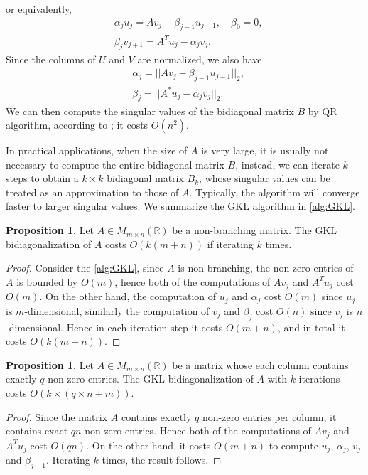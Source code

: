 \documentclass{article}
\theoremstyle{definition}
\newtheorem{proposition}[theorem]{Proposition}
\begin{document}
or equivalently,
\[
\begin{aligned}
&\alpha_ju_j=Av_j-\beta_{j-1}u_{j-1},
\quad \beta_0=0,\\
&\beta_{j}v_{j+1}=A^Tu_j-\alpha_jv_j.
\end{aligned}
\]
Since the columns of $U$ and $V$ are normalized,
we also have
\[
\begin{aligned}
&\alpha_j=||Av_j-\beta_{j-1}u_{j-1}||_2,\\
&\beta_j=||A^*u_j-\alpha_jv_j||_2.
\end{aligned}
\]
We can then compute the singular values of the bidiagonal matrix $B$ by QR algorithm,
according to \cite[Section 6.2]{MR1792141}; 
it costs $O(n^2)$.

In practical applications,
when the size of $A$ is very large,
it is usually not necessary to compute the entire bidiagonal matrix $B$,
instead,
we can iterate $k$ steps to obtain a $k\times k$ bidiagonal matrix $B_k$,
whose singular values can be treated as an approximation to those of $A$. Typically, the algorithm will converge faster to larger singular values.
We summarize the GKL algorithm in \cref{alg:GKL}. 



\begin{proposition}
\label{prop:GKL_speed}
Let $A\in M_{m\times n}(\mathbb{R})$ be a non-branching matrix.
The GKL bidiagonalization of $A$ costs $O(k(m+n))$ if iterating $k$ times.
\end{proposition}
\begin{proof}
Consider the \cref{alg:GKL},
since $A$ is non-branching,
the non-zero entries of $A$ is bounded by $O(m)$,
hence both of the computations of $Av_j$ and $A^Tu_j$ cost $O(m)$.
On the other hand,
the computation of $u_j$ and $\alpha_j$ cost $O(m)$ since $u_j$ is $m$-dimensional,
similarly the computation of $v_j$ and $\beta_j$ cost $O(n)$ since $v_j$ is $n$-dimensional.
Hence in each iteration step it costs $O(m+n)$,
and in total it costs $O(k(m+n))$.
\end{proof}

\begin{proposition}
\label{prop:GKL_speed_2}
Let $A\in M_{m\times n}(\mathbb{R})$ be a matrix whose each column contains exactly $q$ non-zero entries.
The GKL bidiagonalization of $A$ with $k$ iterations costs $O\left(k\times (q\times n+m)\right)$.
\end{proposition}

\begin{proof}
Since the matrix $A$ contains exactly $q$ non-zero entries per column,
it contains exact $qn$ non-zero entries.
Hence both of the computations of $Av_j$ and $A^Tu_j$ cost $O(qn)$.
On the other hand,
it costs $O(m+n)$ to compute $u_j$, $\alpha_j$, $v_{j}$ and $\beta_{j+1}$.
Iterating $k$ times,
the result follows.
\end{proof}
\end{document}
